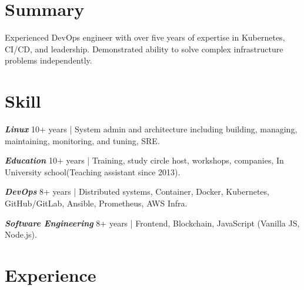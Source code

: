\documentclass[]{deedy-resume-openfont}
\begin{document}
\begin{minipage}[t]{1\textwidth}



\section{Summary}
\begin{summary}
  Experienced DevOps engineer with over five years of expertise in Kubernetes, CI/CD, and leadership. Demonstrated ability to solve complex infrastructure problems independently.
\end{summary}

\section{Skill}
\vspace{\topsep}
\begin{tightemize}
    \item \textbf{\emph{Linux}} 10+ years | System admin and architecture including building, managing, maintaining, monitoring, and tuning, SRE.
    \item \textbf{\emph{Education}} 10+ years | Training, study circle host, workshops, companies, In University school(Teaching assistant since 2013).
    \item \textbf{\emph{DevOps}} 8+ years | Distributed systems, Container, Docker, Kubernetes, GitHub/GitLab, Ansible, Prometheus, AWS Infra.
    \item \textbf{\emph{Software Engineering}}  8+ years | Frontend, Blockchain, JavaScript (Vanilla JS, Node.js).
\end{tightemize}


\section{Experience}


\end{minipage}
\end{document}
